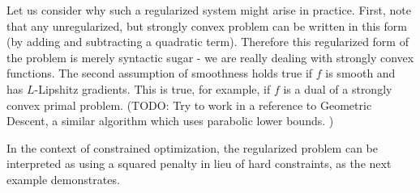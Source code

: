 Let us consider why such a regularized system might arise in practice.
First, note that any unregularized, but strongly convex problem can be written
in this form (by adding and subtracting a quadratic term). Therefore this
regularized form of the problem is merely syntactic sugar - we are really
dealing with strongly convex functions. The second assumption of smoothness
holds true if $f$ is smooth and has $L$-Lipshitz gradients. This is true, for
example, if $f$ is a dual of a strongly convex primal problem. (TODO: Try to
work in a reference to Geometric Descent, a similar algorithm which uses
parabolic lower bounds. \cite{drusvyatskiy2016optimal})

In the context of constrained optimization, the regularized problem can be
interpreted as using a squared penalty in lieu  of hard constraints, as the
next example demonstrates.




